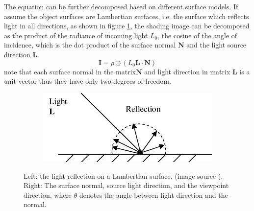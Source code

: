 The equation can be further decomposed based on different surface models. If assume the object surfaces are Lambertian surfaces, i.e. the surface which reflects light in all directions, as shown in figure \ref{fig:lambertian-surface}, the shading image can be decomposed as the product of the radiance of incoming light $ L_0 $, the cosine of the angle of incidence, which is the dot product of the surface normal $ \textbf{N} $ and the light source direction $ \textbf{L} $.
\[ \textbf{I} = \rho \odot ( L_0 \textbf{L} \cdot \textbf{N}) \]
note that each surface normal in the matrix$ \textbf{N} $ and light direction in matrix $ \textbf{L} $ is a unit vector thus they have only two degrees of freedom. 

\begin{figure}[th]
	\centering
	\begin{subfigure}[b]{0.48\linewidth}
		\includegraphics[width=\textwidth]{./Figures/Lambertian-Reflection-Lambertian-Surface.png}
	\end{subfigure}
	\begin{subfigure}[b]{0.48\linewidth}
	\end{subfigure}
	\decoRule
	\caption{Left: the light reflection on a Lambertian surface. (image source \cite{lambertian-reflectance}). Right: The surface normal, source light direction, and the viewpoint direction, where $ \theta $ denotes the angle between light direction and the normal.}
	\label{fig:lambertian-surface}
\end{figure}

